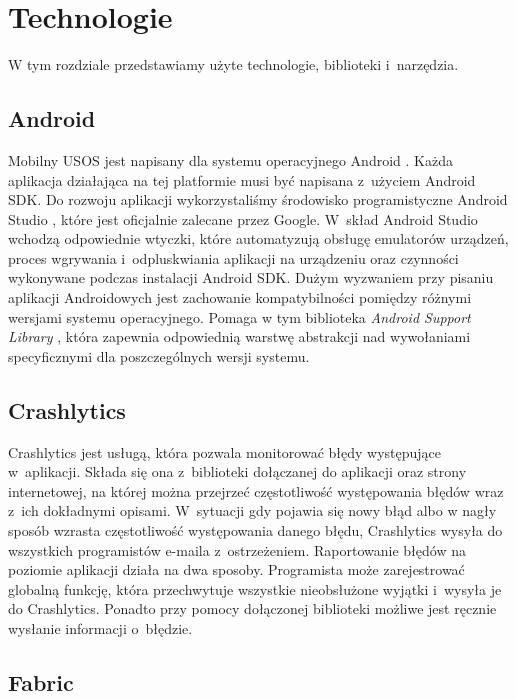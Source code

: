 \documentclass{pracamgr}
\begin{document}
\chapter{Technologie}
\label{sec:technologie}

W tym rozdziale przedstawiamy użyte technologie, biblioteki i~narzędzia.

\section{Android}

Mobilny USOS jest napisany dla systemu operacyjnego Android \cite{android}.
Każda aplikacja działająca na tej platformie musi być napisana z~użyciem Android
SDK. Do rozwoju aplikacji wykorzystaliśmy środowisko programistyczne Android Studio
\cite{androidstudio}, które jest oficjalnie zalecane przez Google. W~skład Android Studio
wchodzą odpowiednie wtyczki, które automatyzują obsługę emulatorów urządzeń, proces
wgrywania i~odpluskwiania aplikacji na urządzeniu oraz czynności wykonywane podczas
instalacji Android SDK. Dużym wyzwaniem przy pisaniu aplikacji Androidowych jest
zachowanie kompatybilności pomiędzy różnymi wersjami systemu operacyjnego. Pomaga
w tym biblioteka \textit{Android Support Library} \cite{androidsupportlibrary},
która zapewnia odpowiednią warstwę abstrakcji nad wywołaniami specyficznymi dla
poszczególnych wersji systemu.

\section{Crashlytics}

Crashlytics \cite{crashlytics} jest usługą, która pozwala monitorować błędy
występujące w~aplikacji. Składa się ona z~biblioteki dołączanej do aplikacji
oraz strony internetowej, na której można przejrzeć częstotliwość występowania
błędów wraz z~ich dokładnymi opisami. W~sytuacji gdy pojawia się nowy błąd albo
w nagły sposób wzrasta częstotliwość występowania danego błędu, Crashlytics wysyła
do wszystkich programistów e-maila z~ostrzeżeniem. Raportowanie błędów na poziomie
aplikacji działa na dwa sposoby. Programista może zarejestrować globalną funkcję,
która przechwytuje wszystkie nieobsłużone wyjątki i~wysyła je do Crashlytics. Ponadto przy
pomocy dołączonej biblioteki możliwe jest ręcznie wysłanie informacji o~błędzie.

\section{Fabric}
\end{document}
